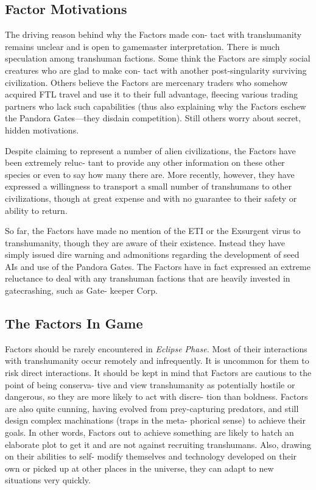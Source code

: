 \subsection{Factor Motivations}

The driving reason behind why the Factors made con-
tact with transhumanity remains unclear and is open to 
gamemaster interpretation. There is much speculation 
among transhuman factions. Some think the Factors 
are simply social creatures who are glad to make con-
tact with another post-singularity surviving civilization. 
Others believe the Factors are mercenary traders who 
somehow acquired FTL travel and use it to their full 
advantage, fleecing various trading partners who lack 
such capabilities (thus also explaining why the Factors 
eschew the Pandora Gates—they disdain competition). 
Still others worry about secret, hidden motivations.

Despite claiming to represent a number of alien 
civilizations, the Factors have been extremely reluc-
tant to provide any other information on these other 
species or even to say how many there are. More 
recently, however, they have expressed a willingness 
to transport a small number of transhumans to other 
civilizations, though at great expense and with no 
guarantee to their safety or ability to return.

So far, the Factors have made no mention of the 
ETI or the Exsurgent virus to transhumanity, though 
they are aware of their existence. Instead they have 
simply issued dire warning and admonitions regarding 
the development of seed AIs and use of the Pandora 
Gates. The Factors have in fact expressed an extreme 
reluctance to deal with any transhuman factions that 
are heavily invested in gatecrashing, such as Gate-
keeper Corp.

\subsection{The Factors In Game }

Factors should be rarely encountered in \textit{Eclipse Phase.}
Most of their interactions with transhumanity occur 
remotely and infrequently. It is uncommon for them to 
risk direct interactions. It should be kept in mind that 
Factors are cautious to the point of being conserva-
tive and view transhumanity as potentially hostile or 
dangerous, so they are more likely to act with discre-
tion than boldness. Factors are also quite cunning, 
having evolved from prey-capturing predators, and 
still design complex machinations (traps in the meta-
phorical sense) to achieve their goals. In other words, 
Factors out to achieve something are likely to hatch an 
elaborate plot to get it and are not against recruiting 
transhumans. Also, drawing on their abilities to self-
modify themselves and technology developed on their 
own or picked up at other places in the universe, they 
can adapt to new situations very quickly. 

